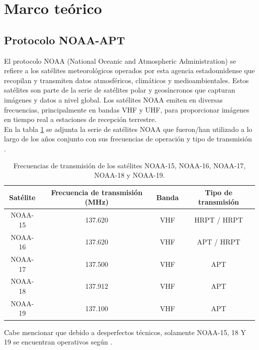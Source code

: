 \section{Marco teórico}
\subsection{Protocolo NOAA-APT}
El protocolo NOAA (National Oceanic and Atmospheric Administration) se refiere a los satélites meteorológicos operados por esta agencia estadounidense que recopilan y transmiten datos atmosféricos, climáticos y medioambientales. Estos satélites son parte de la serie de satélites polar y geosíncronos que capturan imágenes y datos a nivel global. Los satélites NOAA emiten en diversas frecuencias, principalmente en bandas VHF y UHF, para proporcionar imágenes en tiempo real a estaciones de recepción terrestre.\\
En la tabla \ref{tab:noaa_frequencies} se adjunta la serie de satélites NOAA que fueron/han utilizado a lo largo de los años conjunto con sus frecuencias de operación y tipo de transmisión \cite{noaaProyecto}.

\begin{table}[h!]
    \centering
    \begin{tabular}{|c|c|c|c|}
        \hline
        \parbox[c][1cm][c]{3cm}{\centering Satélite} & \parbox[c][1cm][c]{4cm}{\centering Frecuencia de transmisión (MHz)} & \parbox[c][1cm][c]{2cm}{\centering Banda} & \parbox[c][1cm][c]{4cm}{\centering Tipo de transmisión} \\
        \hline
        NOAA-15 & 137.620 & VHF & HRPT / HRPT \\
        \hline
        NOAA-16 & 137.620 & VHF & APT / HRPT \\
        \hline
        NOAA-17 & 137.500 & VHF & APT \\
        \hline
        NOAA-18 & 137.912 & VHF & APT \\
        \hline
        NOAA-19 & 137.100 & VHF & APT \\
        \hline
    \end{tabular}
    \caption{Frecuencias de transmisión de los satélites NOAA-15, NOAA-16, NOAA-17, NOAA-18 y NOAA-19.}
    \label{tab:noaa_frequencies}
\end{table}

Cabe mencionar que debido a desperfectos técnicos, solamente NOAA-15, 18 Y 19 se encuentran operativos según \cite{noaaSatellites}.


